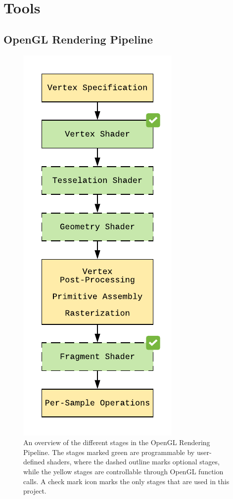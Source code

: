 

\section{Tools}

\subsection{OpenGL Rendering Pipeline}\label{sec:OpenGLRenderingPipeline}

\begin{figure}[!h]
    \centering
    \includegraphics{img/implementation/RenderingPipeline.pdf}
    \caption{An overview of the different stages in the OpenGL Rendering Pipeline. The stages marked green are programmable by user-defined shaders, where the dashed outline marks optional stages, while the yellow stages are controllable through OpenGL function calls. A check mark icon marks the only stages that are used in this project.}
    \label{fig:RenderingPipeline}
\end{figure}

